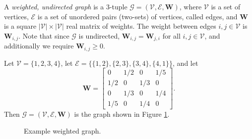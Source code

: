 \documentclass[12pt]{article}
\begin{document}
\begin{defn}
    A \emph{weighted, undirected graph} is a $3$-tuple $\mathcal{G} = (\mathcal{V}, \mathcal{E}, \bm{W})$, where $\mathcal{V}$ is a set of vertices, $\mathcal{E}$ is a set of unordered pairs (two-sets) of vertices, called edges, and $\bm{W}$ is a square $|\mathcal{V}| \times |\mathcal{V}|$ real matrix of weights. The weight between edges $i, j \in \mathcal{V}$ is $\bm{W}_{i, j}$. Note that since $\mathcal{G}$ is undirected, $\bm{W}_{i,j} = \bm{W}_{j, i}$ for all $i, j \in \mathcal{V}$, and additionally we require $\bm{W}_{i, j} \geq 0$.
\end{defn}

\begin{exmp}
    Let $\mathcal{V} = \{1, 2, 3, 4\}$, let $\mathcal{E} = \{\{1, 2\}, \{2, 3\}, \{3, 4\}, \{4, 1\}\}$, and let
    \[\bm{W} = \begin{bmatrix}
        0 & 1/2 & 0 & 1/5 \\
        1/2 & 0 & 1/3 & 0 \\
        0 & 1/3 & 0 & 1/4 \\
        1/5 & 0 & 1/4 & 0
    \end{bmatrix}.\] Then $\mathcal{G} = (\mathcal{V}, \mathcal{E}, \bm{W})$ is the graph shown in Figure \ref{fig:example-weighted-graph}.
\end{exmp}

\begin{figure}[ht!]
    \centering
\caption{Example weighted graph.}
\label{fig:example-weighted-graph}
\end{figure}
\end{document}
